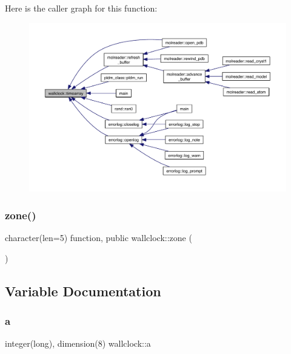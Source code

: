 Here is the caller graph for this function\+:\nopagebreak
\begin{figure}[H]
\begin{center}
\leavevmode
\includegraphics[width=350pt]{namespacewallclock_ac691a026a7b92c6cd971e86d0449d42b_icgraph}
\end{center}
\end{figure}
\mbox{\label{namespacewallclock_ac6bdcdd3cf7fc38f4c738862e2a82dac}} 
\subsubsection{\texorpdfstring{zone()}{zone()}}
{\footnotesize\ttfamily character(len=5) function, public wallclock\+::zone (\begin{DoxyParamCaption}{ }\end{DoxyParamCaption})}



\subsection{Variable Documentation}
\mbox{\label{namespacewallclock_a634d56ca30b98ea804c6d33a0a635ec0}} 
\subsubsection{\texorpdfstring{a}{a}}
{\footnotesize\ttfamily integer(long), dimension(8) wallclock\+::a\hspace{0.3cm}{\ttfamily [private]}}

